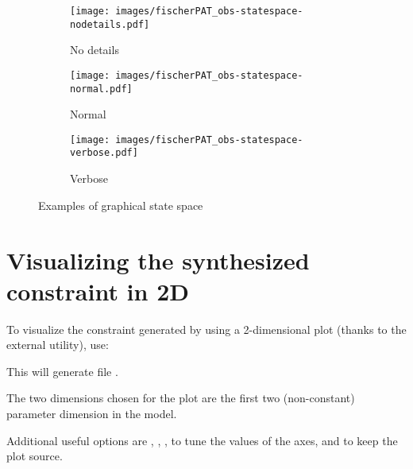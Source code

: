 \begin{figure}
	\centering
	\begin{subfigure}[b]{.48\textwidth}
		\texttt{[image: images/fischerPAT\_obs-statespace-nodetails.pdf]}

		\caption{No details}
		\label{figure:statespace:nodetail}
	\end{subfigure}
	\begin{subfigure}[b]{.48\textwidth}
		\texttt{[image: images/fischerPAT\_obs-statespace-normal.pdf]}

		\caption{Normal}
		\label{figure:statespace:normal}
	\end{subfigure}

	\begin{subfigure}[b]{.75\textwidth}
		\texttt{[image: images/fischerPAT\_obs-statespace-verbose.pdf]}

		\caption{Verbose}
		\label{figure:statespace:verbose}
	\end{subfigure}

	\caption{Examples of graphical state space}
\end{figure}



\section{Visualizing the synthesized constraint in 2D}

To visualize the constraint generated by \imitator{} using a 2-dimensional plot (thanks to the external  utility), use:


This will generate file .

The two dimensions chosen for the plot are the first two (non-constant) parameter dimension in the model.

Additional useful options are
,
,
,
to tune the values of the axes,
and  to keep the plot source.


